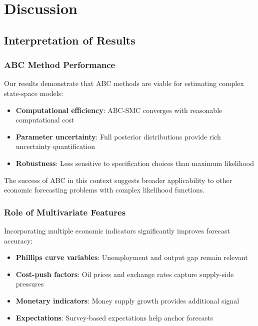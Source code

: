 \section{Discussion}

\subsection{Interpretation of Results}

\subsubsection{ABC Method Performance}

Our results demonstrate that ABC methods are viable for estimating complex state-space models:

\begin{itemize}
    \item \textbf{Computational efficiency}: ABC-SMC converges with reasonable computational cost
    \item \textbf{Parameter uncertainty}: Full posterior distributions provide rich uncertainty quantification
    \item \textbf{Robustness}: Less sensitive to specification choices than maximum likelihood
\end{itemize}

The success of ABC in this context suggests broader applicability to other economic forecasting problems with complex likelihood functions.

\subsubsection{Role of Multivariate Features}

Incorporating multiple economic indicators significantly improves forecast accuracy:

\begin{itemize}
    \item \textbf{Phillips curve variables}: Unemployment and output gap remain relevant
    \item \textbf{Cost-push factors}: Oil prices and exchange rates capture supply-side pressures
    \item \textbf{Monetary indicators}: Money supply growth provides additional signal
    \item \textbf{Expectations}: Survey-based expectations help anchor forecasts
\end{itemize}

